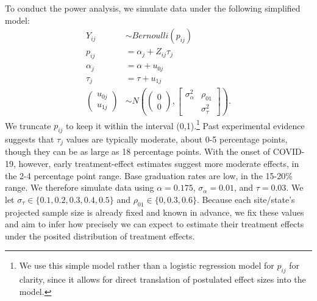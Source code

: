 \documentclass[]{article}
\begin{document}
To conduct the power analysis, we simulate data under the following simplified model:
\begin{align*}
    Y_{ij} &\sim Bernoulli(p_{ij}) \\
    p_{ij} &= \alpha_j + Z_{ij} \tau_j \\
    \alpha_j &= \alpha + u_{0j} \\
	\tau_j &= \tau + u_{1j} \\
	\begin{pmatrix}
		u_{0j} \\ u_{1j}
	\end{pmatrix} &\sim N\left(
	\begin{pmatrix}
		0 \\ 0
	\end{pmatrix}, 
	\begin{bmatrix}
		\sigma^2_\alpha & \rho_{01} \\  & \sigma^2_\tau
	\end{bmatrix}\right).
\end{align*}
We truncate $p_{ij}$ to keep it within the interval (0,1).\footnote{We use this simple model rather than a logistic regression model for $p_{ij}$ for clarity, since it allows for direct translation of postulated effect sizes into the model.}
Past experimental evidence suggests that $\tau_j$ values are typically moderate, about 0-5 percentage points, though they can be as large as 18 percentage points.
With the onset of COVID-19, however, early treatment-effect estimates suggest more moderate effects, in the 2-4 percentage point range.
Base graduation rates are low, in the 15-20\% range.
We therefore simulate data using $\alpha = 0.175$, $\sigma_\alpha=0.01$, and $\tau=0.03$.
We let $\sigma_\tau \in \{0.1, 0.2, 0.3, 0.4, 0.5\}$ and $\rho_{01} \in \{0, 0.3, 0.6\}$.
Because each site/state's projected sample size is already fixed and known in advance, we fix these values and aim to infer how precisely we can expect to estimate their treatment effects under the posited distribution of treatment effects.
\end{document}
